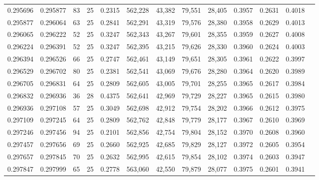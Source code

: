 \begin{tabular}{rrrrrrrrrrrrr}
0.295696 & 0.295877 &    83 &  25 &                                     0.2315 & 562,228 &  43,382 &  79,551 &  28,405 & 0.3957 & 0.2631 & 0.4018 \\
0.295877 & 0.296064 &    63 &  25 &                                     0.2841 & 562,291 &  43,319 &  79,576 &  28,380 & 0.3958 & 0.2629 & 0.4013 \\
0.296065 & 0.296222 &    52 &  25 &                                     0.3247 & 562,343 &  43,267 &  79,601 &  28,355 & 0.3959 & 0.2627 & 0.4008 \\
0.296224 & 0.296391 &    52 &  25 &                                     0.3247 & 562,395 &  43,215 &  79,626 &  28,330 & 0.3960 & 0.2624 & 0.4003 \\
0.296394 & 0.296526 &    66 &  25 &                                     0.2747 & 562,461 &  43,149 &  79,651 &  28,305 & 0.3961 & 0.2622 & 0.3997 \\
0.296529 & 0.296702 &    80 &  25 &                                     0.2381 & 562,541 &  43,069 &  79,676 &  28,280 & 0.3964 & 0.2620 & 0.3989 \\
0.296705 & 0.296831 &    64 &  25 &                                     0.2809 & 562,605 &  43,005 &  79,701 &  28,255 & 0.3965 & 0.2617 & 0.3984 \\
0.296832 & 0.296936 &    36 &  28 &                                     0.4375 & 562,641 &  42,969 &  79,729 &  28,227 & 0.3965 & 0.2615 & 0.3980 \\
0.296936 & 0.297108 &    57 &  25 &                                     0.3049 & 562,698 &  42,912 &  79,754 &  28,202 & 0.3966 & 0.2612 & 0.3975 \\
0.297109 & 0.297245 &    64 &  25 &                                     0.2809 & 562,762 &  42,848 &  79,779 &  28,177 & 0.3967 & 0.2610 & 0.3969 \\
0.297246 & 0.297456 &    94 &  25 &                                     0.2101 & 562,856 &  42,754 &  79,804 &  28,152 & 0.3970 & 0.2608 & 0.3960 \\
0.297457 & 0.297656 &    69 &  25 &                                     0.2660 & 562,925 &  42,685 &  79,829 &  28,127 & 0.3972 & 0.2605 & 0.3954 \\
0.297657 & 0.297845 &    70 &  25 &                                     0.2632 & 562,995 &  42,615 &  79,854 &  28,102 & 0.3974 & 0.2603 & 0.3947 \\
0.297847 & 0.297999 &    65 &  25 &                                     0.2778 & 563,060 &  42,550 &  79,879 &  28,077 & 0.3975 & 0.2601 & 0.3941 \\

\end{tabular}
